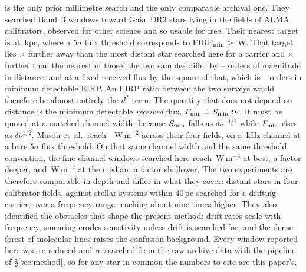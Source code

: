 \citet{Mason2025} is the only prior millimetre search and the only
comparable archival one. They searched Band~3 windows toward
\MasonNStar{} Gaia~DR3 stars lying in the fields of \MasonNCal{} ALMA
calibrators, observed for other science and so usable for free. Their
nearest target is at \MasonNearKpc\,kpc, where a $5\sigma$ flux threshold
corresponds to EIRP$_{\rm min}>{}$\MasonNearEirp\,W. That target lies
\MasonDistRatioFar$\times$ further away than the most distant star searched
here for a carrier and \MasonDistRatioNear$\times$ further than the nearest
of those: the two
samples differ by \MasonDistOrdLo--\MasonDistOrdHi{} orders of magnitude in
distance, and at a fixed received flux by the square of that, which is
\MasonEirpOrdLo--\MasonEirpOrdHi{} orders in minimum detectable EIRP. An EIRP
ratio between the two surveys would therefore be almost entirely the $d^{2}$
term. The quantity
that does not depend on distance is the minimum detectable \emph{received}
flux, $F_{\rm min}=S_{\rm min}\,\delta\nu$. It must be quoted at a matched
channel width, because $S_{\rm min}$ falls as $\delta\nu^{-1/2}$ while
$F_{\rm min}$ rises as $\delta\nu^{1/2}$. Mason
et~al.\ reach \MasonFluxLo--\MasonFluxHi\,W\,m$^{-2}$ across their four
fields, on a \MasonChanKHz\,kHz channel at a bare $5\sigma$ flux
threshold. On
that same channel width and the same threshold convention, the
fine-channel windows searched here reach \FluxMatchBest\,W\,m$^{-2}$ at
best, a factor \FluxBestRatio{} deeper, and \FluxMatchMed\,W\,m$^{-2}$ at
the median, a factor \FluxMedRatio{} shallower. The two experiments are
therefore comparable in depth and differ in what they cover: distant stars
in four calibrator fields, against \NSysClassA{} stellar systems within
40\,pc searched for a drifting carrier, over a frequency range reaching
about nine times higher. They also
identified the obstacles that shape the present method: drift rates scale
with frequency, smearing erodes sensitivity unless drift is searched for,
and the dense forest of molecular lines raises the confusion background.
Every window reported here was re-reduced and re-searched from the raw
archive data with the pipeline of \S\ref{sec:method}, so for any star in
common the numbers to cite are this paper's.

